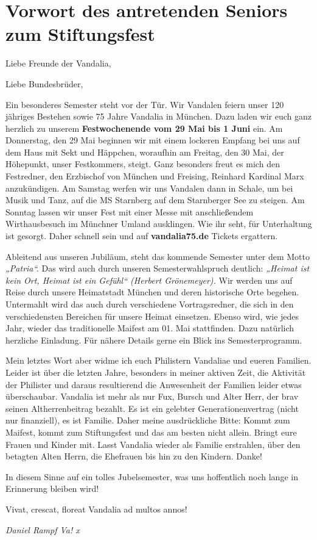 \section{Vorwort des antretenden Seniors zum Stiftungsfest}

Liebe Freunde der Vandalia,

Liebe Bundesbrüder,
\begin{multicols}{2}
Ein besonderes
Semester steht vor der Tür. Wir Vandalen feiern unser 120 jähriges Bestehen
sowie 75 Jahre Vandalia in München. Dazu laden wir euch ganz herzlich zu
unserem \textbf{Festwochenende vom 29 Mai bis 1 Juni} ein. Am Donnerstag, den
29 Mai beginnen wir mit einem lockeren Empfang bei uns auf dem Haus mit Sekt
und Häppchen, woraufhin am Freitag, den 30 Mai, der Höhepunkt, unser
Festkommers, steigt. Ganz besonders freut es mich den Festredner, den Erzbischof
von München und Freising, Reinhard Kardinal Marx anzukündigen. Am Samstag
werfen wir uns Vandalen dann in Schale, um bei Musik und Tanz, auf die MS
Starnberg auf dem Starnberger See zu steigen. Am Sonntag lassen wir unser Fest
mit einer Messe mit anschließendem Wirthausbesuch im Münchner Umland
ausklingen. Wie ihr seht, für Unterhaltung ist gesorgt. Daher schnell sein und auf
\textbf{vandalia75.de} Tickets ergattern.

Ableitend aus
unseren Jubiläum, steht das kommende Semester unter dem Motto \textit{„Patria“.} Das
wird auch durch unseren Semesterwahlspruch deutlich: \textit{„Heimat ist kein Ort,
Heimat ist ein Gefühl“ (Herbert Grönemeyer). }Wir werden uns auf Reise durch
unsere Heimatstadt München und deren historische Orte begehen. Untermahlt wird
das auch durch verschiedene Vortragsredner, die sich in den verschiedensten
Bereichen für unsere Heimat einsetzen. Ebenso wird, wie jedes Jahr, wieder das
traditionelle Maifest am 01. Mai stattfinden. Dazu natürlich herzliche
Einladung. Für nähere Details gerne ein Blick ins Semesterprogramm.

Mein letztes Wort aber
widme ich euch Philistern Vandaliae und eueren Familien. Leider ist über die letzten
Jahre, besonders in meiner aktiven Zeit, die Aktivität der Philister und daraus
resultierend die Anwesenheit der Familien leider etwas überschaubar. Vandalia
ist mehr als nur Fux, Bursch und Alter Herr, der brav seinen Altherrenbeitrag
bezahlt. Es ist ein gelebter Generationenvertrag (nicht nur finanziell), es ist
Familie. Daher meine
ausdrückliche Bitte: Kommt zum Maifest, kommt zum Stiftungsfest und das am besten
nicht allein. Bringt eure Frauen und Kinder mit. Lasst Vandalia wieder als Familie
erstrahlen, über den betagten Alten Herrn, die Ehefrauen bis hin zu den
Kindern. Danke!

In diesem Sinne auf
ein tolles Jubelsemester, was uns hoffentlich noch lange in \newline Erinnerung bleiben
wird!

Vivat, crescat, floreat Vandalia ad multos annos!

	\begin{flushright}
		\hfill\emph{Daniel Rampf Va! x}
	\end{flushright}
\end{multicols}

